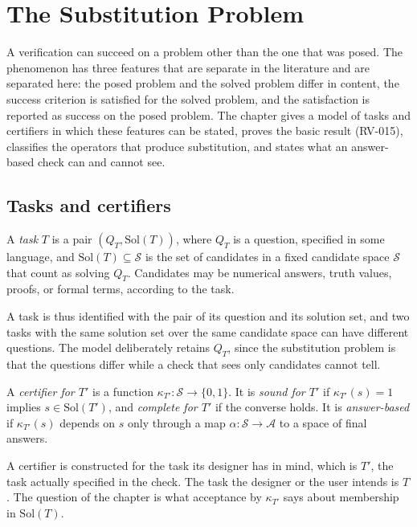 \chapter{The Substitution Problem}
\label{ch:substitution}

A verification can succeed on a problem other than the one that was posed. The phenomenon has three features that are separate in the literature and are separated here: the posed problem and the solved problem differ in content, the success criterion is satisfied for the solved problem, and the satisfaction is reported as success on the posed problem. The chapter gives a model of tasks and certifiers in which these features can be stated, proves the basic result (RV-015), classifies the operators that produce substitution, and states what an answer-based check can and cannot see.

\section{Tasks and certifiers}

\begin{definition}[Task]
\label{def:task}
A \emph{task} $T$ is a pair $(Q_T, \mathrm{Sol}(T))$, where $Q_T$ is a question, specified in some language, and $\mathrm{Sol}(T) \subseteq \mathcal{S}$ is the set of candidates in a fixed candidate space $\mathcal{S}$ that count as solving $Q_T$. Candidates may be numerical answers, truth values, proofs, or formal terms, according to the task.
\end{definition}

A task is thus identified with the pair of its question and its solution set, and two tasks with the same solution set over the same candidate space can have different questions. The model deliberately retains $Q_T$, since the substitution problem is that the questions differ while a check that sees only candidates cannot tell.

\begin{definition}[Certifier]
\label{def:certifier}
A \emph{certifier for $T'$} is a function $\kappa_{T'} : \mathcal{S} \to \{0,1\}$. It is \emph{sound for $T'$} if $\kappa_{T'}(s) = 1$ implies $s \in \mathrm{Sol}(T')$, and \emph{complete for $T'$} if the converse holds. It is \emph{answer-based} if $\kappa_{T'}(s)$ depends on $s$ only through a map $\alpha : \mathcal{S} \to \mathcal{A}$ to a space of final answers.
\end{definition}

A certifier is constructed for the task its designer has in mind, which is $T'$, the task actually specified in the check. The task the designer or the user intends is $T$. The question of the chapter is what acceptance by $\kappa_{T'}$ says about membership in $\mathrm{Sol}(T)$.


